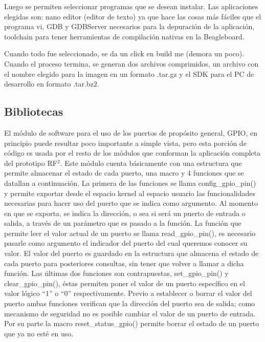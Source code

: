 \bigskip
Luego se permiten seleccionar programas que se desean instalar.
Las aplicaciones elegidas son: nano editor (editor de texto) ya que hace las cosas más fáciles que el programa vi, GDB y GDBServer necesarios para la depuración de la aplicación, toolchain para tener herramientas de compilación nativas en la Beagleboard.

\bigskip
Cuando todo fue seleccionado, se da un click en build me (demora un poco).
Cuando el proceso termina, se generan dos archivos comprimidos, un archivo con el nombre elegido para la imagen en un formato .tar.gz y el SDK para el PC de desarrollo en formato .tar.bz2. 

\subsection{Bibliotecas}


El módulo de software para el uso de los puertos de propósito general, GPIO, en principio puede resultar poco importante a simple vista, pero esta porción de código es usada por el resto de los módulos que conforman la aplicación completa del prototipo RF$^{2}$. 
Este módulo cuenta básicamente con una estructura que permite almacenar el estado de cada puerto, una macro y 4 funciones que se datallan a continuación.
La primera de las funciones se llama config\_gpio\_pin() y permite exportar desde el espacio kernel al espacio usuario las funcionalidades necesarias para hacer uso del puerto que se indica como argumento. Al momento en que se exporta, se indica la dirección, o sea si será un puerto de entrada o salida, a través de un parámetro que es pasado a la función.
La función que permite leer el valor actual de un puerto se llama read\_gpio\_pin(), es necesario pasarle como argumento el indicador del puerto del cual queremos conocer su valor. El valor del puerto es guardado en la estructura que almacena el estado de cada puerto para posteriores consultas, sin tener que volver a llamar a dicha función.
Las últimas dos funciones son contrapuestas, set\_gpio\_pin() y clear\_gpio\_pin(), éstas permiten poner el valor de un puerto específico en el valor lógico “1” o “0” respectivamente. Previo a establecer o borrar el valor del puerto ambas funciones verifican que la dirección del puerto sea de salida; como mecanismo de seguridad no es posible cambiar el valor de un puerto de entrada.
Por su parte la macro reset\_status\_gpio() permite borrar el estado de un puerto que ya no esté en uso.

